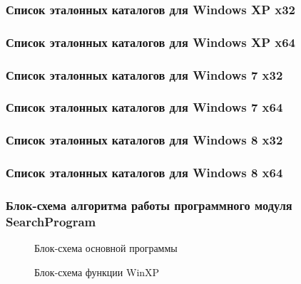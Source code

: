 \subsubsection{Список эталонных каталогов для Windows XP x32}


\subsubsection{Список эталонных каталогов для Windows XP x64}


\subsubsection{Список эталонных каталогов для Windows 7 x32}


\subsubsection{Список эталонных каталогов для Windows 7 x64}


\subsubsection{Список эталонных каталогов для Windows 8 x32}


\subsubsection{Список эталонных каталогов для Windows 8 x64}


\subsubsection{Блок-схема алгоритма работы программного модуля SearchProgram}

\begin{figure}[h!]
\caption{Блок-схема основной программы}
\label{kucher_9:kucher_9}
\end{figure}

\begin{figure}[h!]
\caption{Блок-схема функции WinXP}
\label{kucher_10:kucher_10}
\end{figure}


